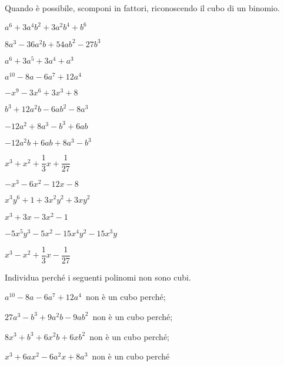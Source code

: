 \begin{esercizio}
\label{ese:16.20}
Quando è possibile, scomponi in fattori, riconoscendo il cubo di un binomio.
\begin{htmulticols}{2}
\begin{enumeratea}
\item \(a^{6}+3a^{4}b^{2}+3a^{2}b^{4}+b^{6}\) 
\item \(8a^{3}\!-\!36a^{2}b\!+\!54ab^{2}\!-\!27b^{3}\) 
\item \(a^{6}+3a^{5}+3a^{4}+a^{3}\) 
\item \(a^{10}-8a-6a^{7}+12a^{4}\) 
\item \(-x^{9}-3x^{6}+3x^{3}+8\)
\item \(b^{3}+12a^{2}b-6ab^{2}-8a^{3}\)
\item \(-12a^{2}+8a^{3}-b^{3}+6ab\)
\item \(-12a^{2}b+6ab+8a^{3}-b^{3}\)
\item \(x^{3}+x^{2}+\dfrac{1}{3}x+\dfrac{1}{27}\)
\item \(-x^{3}-6x^{2}-12x-8\)
\item \(x^{3}y^{6}+1+3x^{2}y^{2}+3xy^{2}\)
\item \(x^{3}+3x-3x^{2}-1\)
\item \(-5x^{5}y^{3}-5x^{2}-15x^{4}y^{2}-15x^{3}y\)
\item \(x^{3}-x^{2}+\dfrac{1}{3}x-\dfrac{1}{27}\)
\end{enumeratea}
\end{htmulticols}
\end{esercizio}

\begin{esercizio}
\label{ese:16.24}
Individua perché i seguenti polinomi non sono cubi.
\begin{enumeratea}
\item \(a^{10}-8a-6a^{7}+12a^{4}\)\, non è un cubo perché\dotfill;
\item \(27a^{3}-b^{3}+9a^{2}b-9ab^{2}\)\, non è un cubo perché\dotfill;
\item \(8x^{3}+b^{3}+6x^{2}b+6{xb}^{2}\)\, non è un cubo perché\dotfill;
\item \(x^{3}+6ax^{2}-6a^{2}x+8a^{3}\)\, non è un cubo perché\dotfill
\end{enumeratea}
\end{esercizio}

